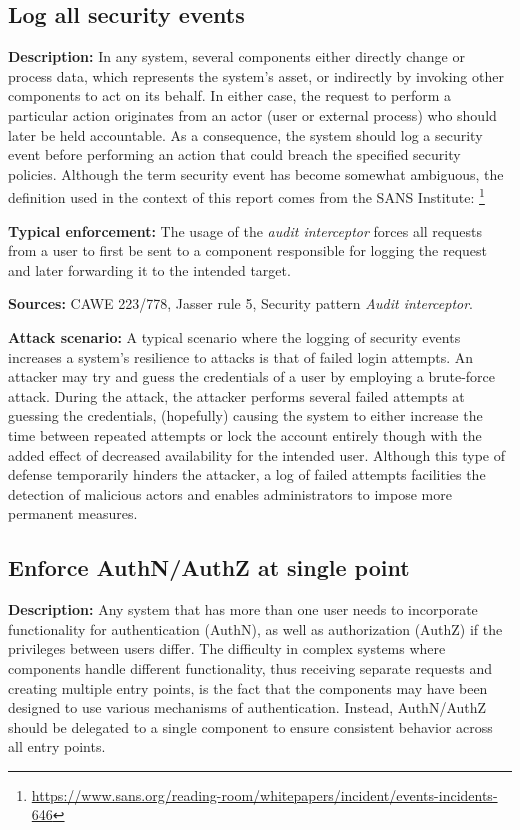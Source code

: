 \subsection{Log all security events } 

\textbf{Description:} In any system, several components either directly change or process data, which represents the system's asset, or indirectly by invoking other components to act on its behalf. In either case, the request to perform a particular action originates from an actor (user or external process) who should later be held accountable.  As a consequence, the system should log a security event before performing an action that could breach the specified security policies. Although the term security event has become somewhat ambiguous, the definition used in the context of this report comes from the SANS Institute:   \footnote{\url{https://www.sans.org/reading-room/whitepapers/incident/events-incidents-646}}

\textbf{Typical enforcement:} The usage of the \textit{audit interceptor} forces all requests from a user to first be sent to a component responsible for logging the request and later forwarding it to the intended target. 

\textbf{Sources:} CAWE 223/778, Jasser rule 5, Security pattern \textit{Audit interceptor}.

\textbf{Attack scenario:} A typical scenario where the logging of security events increases a system's resilience to attacks is that of failed login attempts. An attacker may try and guess the credentials of a user by employing a brute-force attack. During the attack, the attacker performs several failed attempts at guessing the credentials, (hopefully) causing the system to either increase the time between repeated attempts or lock the account entirely though with the added effect of decreased availability for the intended user. Although this type of defense temporarily hinders the attacker, a log of failed attempts facilities the detection of malicious actors and enables administrators to impose more permanent measures. 

\subsection{Enforce AuthN/AuthZ at single point} 
 
 \textbf{Description:} Any system that has more than one user needs to incorporate functionality for authentication (AuthN), as well as authorization (AuthZ) if the privileges between users differ. The difficulty in complex systems where components handle different functionality, thus receiving separate requests and creating multiple entry points, is the fact that the components may have been designed to use various mechanisms of authentication. Instead, AuthN/AuthZ should be delegated to a single component to ensure consistent behavior across all entry points. 
 
